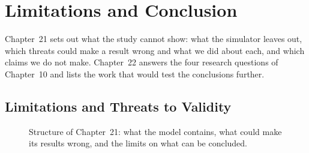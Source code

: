 
\part{Limitations and Conclusion}
\label{part:conclusion}

\begin{center}
\end{center}

\begin{keybox}
Chapter~21 sets out what the study cannot show: what the simulator leaves out,
which threats could make a result wrong and what we did about each, and which
claims we do not make. Chapter~22 answers the four research questions of
Chapter~10 and lists the work that would test the conclusions further.
\end{keybox}

\chapter{Limitations and Threats to Validity}
\label{ch:limits}

\begin{figure}[htbp]
\centering
{}
\caption[]{Structure of Chapter~21: what the model contains,
what could make its results wrong, and the limits on what can be concluded.}
\label{fig:ch21-map}
\end{figure}

